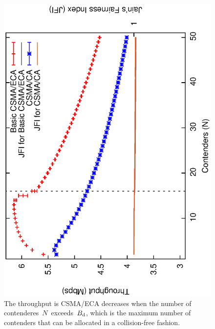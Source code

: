 
\begin{figure}[htbp]
  \centering
  \includegraphics[width=0.7\linewidth, angle = -90]{figures/errorPlots/ECA-vs-CA-JFI.eps}
  \caption{The throughput is CSMA/ECA decreases when the number of contenderes~$N$~exceeds~$B_{\mbox{\scriptsize{d}}}$, which is the maximum number of contenders that can be allocated in a collision-free fashion.
  \label{fig:throughput}}
\end{figure}